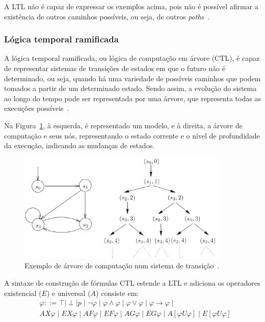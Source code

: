 A LTL não é capaz de expressar os exemplos acima, pois não é possível afirmar a existência de outros caminhos possíveis, ou seja, de outros \textit{paths}~\cite{huth2004logic}.

\subsubsection{Lógica temporal ramificada}

A lógica temporal ramificada, ou lógica de computação em árvore (CTL), é capaz de representar sistemas de transições de estados em que o futuro não é determinado, ou seja, quando há uma variedade de possíveis caminhos que podem tomados a partir de um determinado estado. Sendo assim, a evolução do sistema ao longo do tempo pode ser representada por uma árvore, que representa todas as execuções possíveis~\cite{huth2004logic}.

Na Figura~\ref{fig:ctl_ex}, à esquerda, é representado um modelo, e à direita, a árvore de computação e seus nós, representando o estado corrente e o nível de profundidade da execução, indicando as mudanças de estados.

\begin{figure}[ht]
	\centering
	\includegraphics[width=0.9\textwidth]{imagens/ctl_ex.png}
	\caption{Exemplo de árvore de computação num sistema de transição~\cite{huth2004logic}.
		\label{fig:ctl_ex}}
\end{figure}
\FloatBarrier

A sintaxe de construção de fórmulas CTL estende a LTL e adiciona os operadores existencial ($E$) e universal ($A$) consiste em:
\begin{equation}
\begin{align*}
& \varphi ::= \top \mid \perp \mid p \mid \neg \varphi \mid \varphi \wedge \varphi \mid \varphi\vee\varphi \mid \varphi \to \varphi \mid \\ 
& AX\varphi \mid EX\varphi \mid AF\varphi \mid EF\varphi \mid AG\varphi \mid EG\varphi \mid A[\varphi U \varphi]\mid E[\varphi U \varphi]
\end{align*}
\end{equation} 


